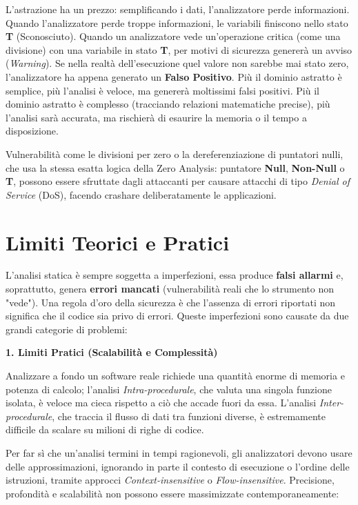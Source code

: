 L'astrazione ha un prezzo: semplificando i dati, l'analizzatore perde informazioni. 
Quando l'analizzatore perde troppe informazioni, le variabili finiscono nello stato 
\textbf{T} (Sconosciuto). Quando un analizzatore vede un'operazione critica (come una 
divisione) con una variabile in stato \textbf{T}, per motivi di sicurezza genererà un 
avviso (\textit{Warning}). Se nella realtà dell'esecuzione quel valore non sarebbe 
mai stato zero, l'analizzatore ha appena generato un \textbf{Falso Positivo}.
Più il dominio astratto è semplice, più l'analisi è veloce, ma genererà moltissimi 
falsi positivi. Più il dominio astratto è complesso (tracciando relazioni matematiche 
precise), più l'analisi sarà accurata, ma rischierà di esaurire la memoria o il 
tempo a disposizione.

Vulnerabilità come le divisioni per zero o la dereferenziazione di puntatori nulli, 
che usa la stessa esatta logica della Zero Analysis: puntatore \textbf{Null}, 
\textbf{Non-Null} o \textbf{T}, possono essere sfruttate dagli attaccanti per 
causare attacchi di tipo \textit{Denial of Service} (DoS), facendo crashare 
deliberatamente le applicazioni.

\section{Limiti Teorici e Pratici}

L'analisi statica è sempre soggetta a imperfezioni, essa produce \textbf{falsi allarmi} 
e, soprattutto, genera \textbf{errori mancati} (vulnerabilità reali che lo strumento 
non "vede"). Una regola d'oro della sicurezza è che l'assenza di errori riportati non 
significa che il codice sia privo di errori. Queste imperfezioni sono causate da due 
grandi categorie di problemi:

\textbf{1. Limiti Pratici (Scalabilità e Complessità)}

Analizzare a fondo un software reale richiede una quantità enorme di memoria e 
potenza di calcolo; l'analisi \textit{Intra-procedurale}, che valuta una singola 
funzione isolata, è veloce ma cieca rispetto a ciò che accade fuori da essa. L'analisi 
\textit{Inter-procedurale}, che traccia il flusso di dati tra funzioni diverse, è 
estremamente difficile da scalare su milioni di righe di codice. 

Per far sì che un'analisi termini in tempi ragionevoli, gli analizzatori devono usare 
delle approssimazioni, ignorando in parte il contesto di esecuzione o l'ordine delle 
istruzioni, tramite approcci \textit{Context-insensitive} o \textit{Flow-insensitive}.
Precisione, profondità e scalabilità non possono essere massimizzate contemporaneamente:


